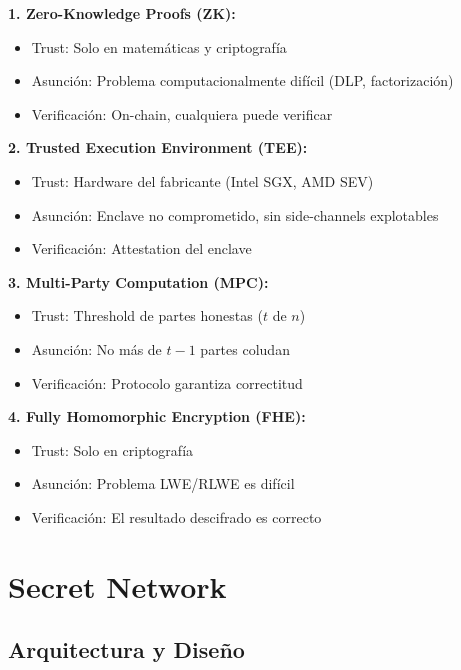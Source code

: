 \documentclass[11pt,a4paper,twoside]{book}
\theoremstyle{definition}
\theoremstyle{remark}
\begin{document}
\begin{mathnote}
\textbf{1. Zero-Knowledge Proofs (ZK):}
\begin{itemize}
    \item Trust: Solo en matemáticas y criptografía
    \item Asunción: Problema computacionalmente difícil (DLP, factorización)
    \item Verificación: On-chain, cualquiera puede verificar
\end{itemize}

\textbf{2. Trusted Execution Environment (TEE):}
\begin{itemize}
    \item Trust: Hardware del fabricante (Intel SGX, AMD SEV)
    \item Asunción: Enclave no comprometido, sin side-channels explotables
    \item Verificación: Attestation del enclave
\end{itemize}

\textbf{3. Multi-Party Computation (MPC):}
\begin{itemize}
    \item Trust: Threshold de partes honestas ($t$ de $n$)
    \item Asunción: No más de $t-1$ partes coludan
    \item Verificación: Protocolo garantiza correctitud
\end{itemize}

\textbf{4. Fully Homomorphic Encryption (FHE):}
\begin{itemize}
    \item Trust: Solo en criptografía
    \item Asunción: Problema LWE/RLWE es difícil
    \item Verificación: El resultado descifrado es correcto
\end{itemize}
\end{mathnote}

\section{Secret Network}
\label{sec:secret-network}

\subsection{Arquitectura y Diseño}
\end{document}
